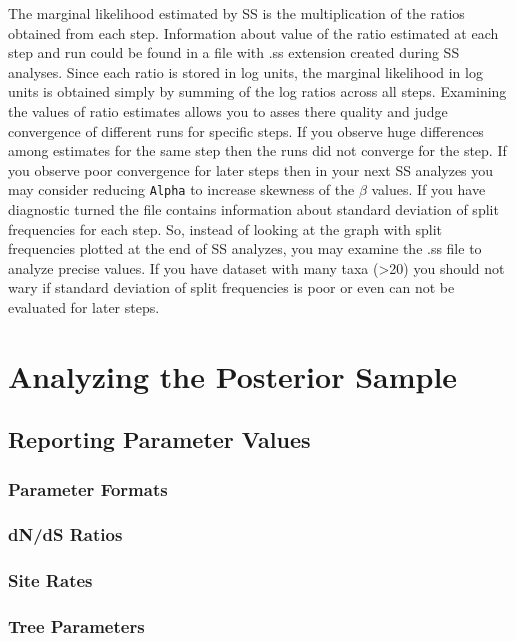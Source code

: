 \documentclass[12pt]{book}
\newcommand{\ttt}[1]{\texttt{#1} }
\begin{document}
The marginal likelihood estimated by SS is the multiplication of the ratios obtained from each step.
Information about value of the ratio estimated at each step and run could be found in a file with .ss 
extension created during SS analyses. Since each ratio is stored in log units, the marginal likelihood
 in log units is obtained simply by summing of the log ratios across all steps. Examining the values of
 ratio estimates allows you to asses there quality and judge convergence of different runs for specific
 steps. If you observe huge differences among estimates for the same step then the runs did not converge
 for the step. If you observe poor convergence for later steps then in your next SS analyzes you may
 consider reducing \ttt{Alpha} to increase skewness of the $\beta$ values. 
If you have diagnostic turned the file contains information about standard deviation of split frequencies
 for each step. So, instead of looking at the graph with split frequencies plotted at the end of SS analyzes,
 you may examine the .ss file to analyze precise values. If you have dataset with many taxa (>20) you should
 not wary if standard deviation of split frequencies is poor or even can not be evaluated for later steps. 




\section{Analyzing the Posterior Sample}

\subsection{Reporting Parameter Values}

\subsubsection{Parameter Formats}

\subsubsection{dN/dS Ratios}

\subsubsection{Site Rates}

\subsubsection{Tree Parameters}
\end{document}

